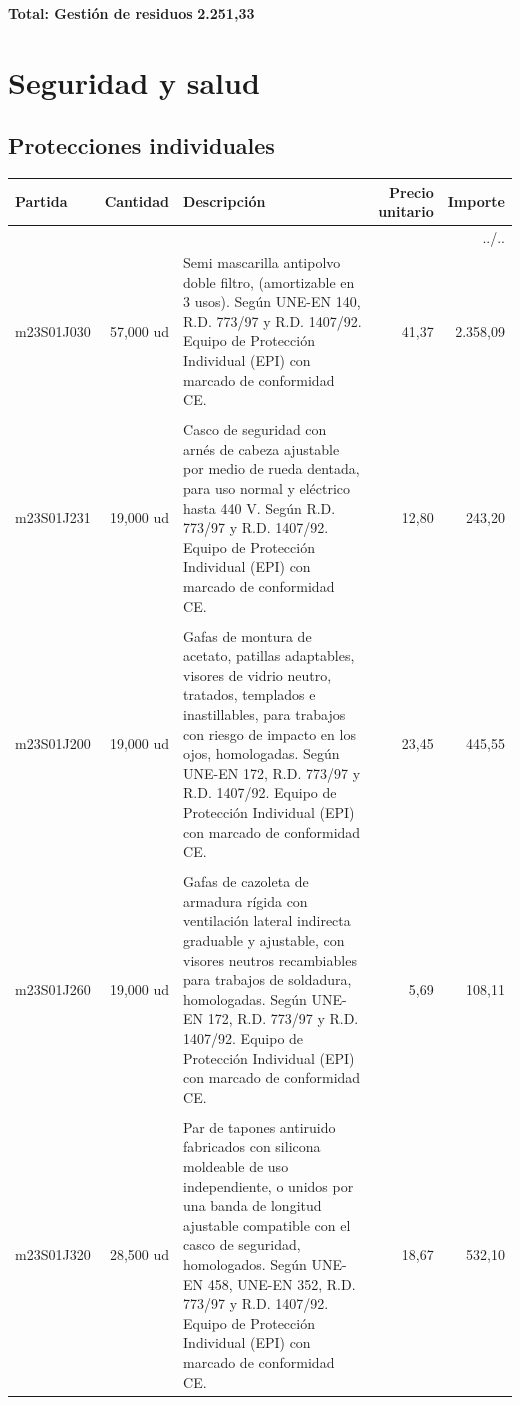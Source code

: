 \documentclass{book}%
\begin{document}
%
\noindent%
\large%
\textbf{Total: Gestión de residuos }%
\dotfill%
\textbf{2.251,33}%
\newline%
\normalsize

%
\section{Seguridad y salud}%
\subsection{Protecciones individuales}%
\small%
\begin{longtable}{lrlrr}%
Partida&Cantidad&Descripción&\multicolumn{1}{p{1.5cm}}{Precio unitario}&Importe\\%
\hline%
\endhead%
\multicolumn{5}{r}{../..}\\%
\endfoot%
\hline%
\endlastfoot%
m23S01J030&    57,000 ud&\multicolumn{1}{p{5cm}}{Semi mascarilla antipolvo doble filtro, (amortizable en 3 usos). Según UNE{-}EN 140, R.D. 773/97 y R.D. 1407/92. Equipo de Protección Individual (EPI) con marcado de conformidad CE.}&     41,37&2.358,09\\%
&&&&\\%
m23S01J231&    19,000 ud&\multicolumn{1}{p{5cm}}{Casco de seguridad con arnés de cabeza ajustable por medio de rueda dentada, para uso normal y eléctrico hasta 440 V. Según R.D. 773/97 y R.D. 1407/92. Equipo de Protección Individual (EPI) con marcado de conformidad CE.}&     12,80&243,20\\%
&&&&\\%
m23S01J200&    19,000 ud&\multicolumn{1}{p{5cm}}{Gafas de montura de acetato, patillas adaptables, visores de vidrio neutro, tratados, templados e inastillables, para trabajos con riesgo de impacto en los ojos, homologadas. Según UNE{-}EN 172, R.D. 773/97 y R.D. 1407/92. Equipo de Protección Individual (EPI) con marcado de conformidad CE.}&     23,45&445,55\\%
&&&&\\%
m23S01J260&    19,000 ud&\multicolumn{1}{p{5cm}}{Gafas de cazoleta de armadura rígida con ventilación lateral indirecta graduable y ajustable, con visores neutros recambiables para trabajos de soldadura, homologadas. Según UNE{-}EN 172, R.D. 773/97 y R.D. 1407/92. Equipo de Protección Individual (EPI) con marcado de conformidad CE.}&      5,69&108,11\\%
&&&&\\%
m23S01J320&    28,500 ud&\multicolumn{1}{p{5cm}}{Par de tapones antiruido fabricados con silicona moldeable de uso independiente, o unidos por una banda de longitud ajustable compatible con el casco de seguridad, homologados. Según UNE{-}EN 458, UNE{-}EN 352, R.D. 773/97 y R.D. 1407/92. Equipo de Protección Individual (EPI) con marcado de conformidad CE.}&     18,67&532,10\\%

\end{longtable}
\end{document}

